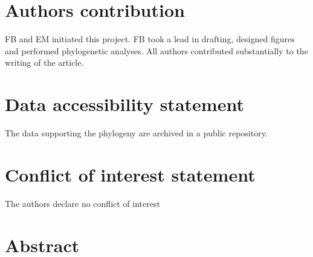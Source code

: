 \documentclass{article}
\begin{document}
	
		\section*{Authors contribution}
	FB and EM initiated this project. FB took a lead in drafting, designed figures and performed phylogenetic analyses. All authors contributed substantially to the writing of the article.
	
			\section*{Data accessibility statement}
	The data supporting the phylogeny are archived in a public repository. 
	 
	 	\section*{Conflict of interest statement}
	 The authors declare no conflict of interest
	
	\newpage
	
	\section*{Abstract} %
	
\end{document}
